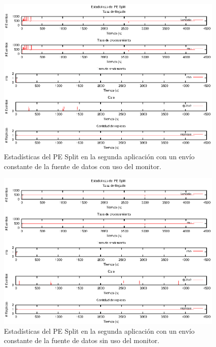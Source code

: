 \begin{figure}[p]
\centering
    \includegraphics[scale=1.1]{images/exp/app2/uniform/cm/statusSplitPE.eps}
    \caption{Estadísticas del PE Split en la segunda aplicación con un envío constante de la fuente de datos con uso del monitor.}
    \label{fig:app2-uniform-statusSplitPE-cm}
\end{figure}

\begin{figure}[p]
\centering
    \includegraphics[scale=1.1]{images/exp/app2/uniform/sm/statusSplitPE.eps}
    \caption{Estadísticas del PE Split en la segunda aplicación con un envío constante de la fuente de datos sin uso del monitor.}
    \label{fig:app2-uniform-statusSplitPE-sm}
\end{figure}

